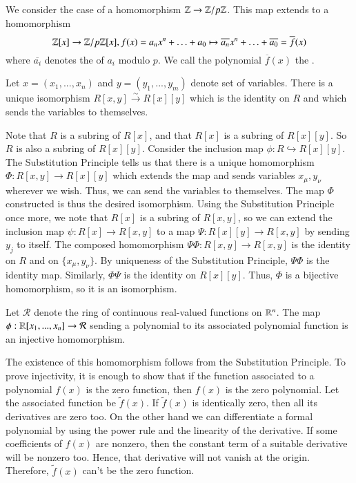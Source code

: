 \documentclass[12pt, a4paper, twoside, openright, titlepage]{book}
\begin{document}
\begin{eg}{}{}
        We consider the case of a homomorphism $\mathbb Z \rightarrow \mathbb Z/p\mathbb Z$. This map extends to a homomorphism \begin{equation}
                \mathbb Z[x] \rightarrow \mathbb Z/p\mathbb Z[x], f(x) = a_nx^n+\hdots + a_0 \mapsto \overline{a_n}x^n+\hdots + \overline{a_0} = \overline{f}(x)
        \end{equation}
        where $\overline{a_i}$ denotes the  of $a_i$ modulo $p$. We call the polynomial $\overline{f}(x)$ the .
\end{eg}


\begin{cor}{}{}
        Let $x = (x_1,...,x_n)$ and $y = (y_1,...,y_m)$ denote set of variables. There is a unique isomorphism $R[x,y] \xrightarrow{\sim}R[x][y]$ which is the identity on $R$ and which sends the variables to themselves.
\end{cor}
\begin{proof*}{}{}
        Note that $R$ is a subring of $R[x]$, and that $R[x]$ is a subring of $R[x][y]$. So $R$ is also a subring of $R[x][y]$. Consider the inclusion map $\phi:R\hookrightarrow R[x][y]$. The Substitution Principle tells us that there is a unique homomorphism $\Phi:R[x,y] \rightarrow R[x][y]$ which extends the map and sends variables $x_{\mu},y_{\nu}$ wherever we wish. Thus, we can send the variables to themselves. The map $\Phi$ constructed is thus the desired isomorphism. Using the Substitution Principle once more, we note that $R[x]$ is a subring of $R[x,y]$, so we can extend the inclusion map $\psi:R[x] \rightarrow R[x,y]$ to a map $\Psi:R[x][y] \rightarrow R[x,y]$ by sending $y_j$ to itself. The composed homomorphism $\Psi\Phi: R[x,y] \rightarrow R[x,y]$ is the identity on $R$ and on $\{x_{\mu},y_{\nu}\}$. By uniqueness of the Substitution Principle, $\Psi\Phi$ is the identity map. Similarly, $\Phi\Psi$ is the identity on $R[x][y]$. Thus, $\Phi$ is a bijective homomorphism, so it is an isomorphism.
\end{proof*}


\begin{prop}{}{}
        Let $\mathcal{R}$ denote the ring of continuous real-valued functions on $\mathbb R^n$. The map $\phi:\mathbb R[x_1,...,x_n]\rightarrow \mathcal{R}$ sending a polynomial to its associated polynomial function is an injective homomorphism.
\end{prop}
\begin{proof*}{}{}
        The existence of this homomorphism follows from the Substitution Principle. To prove injectivity, it is enough to show that if the function associated to a polynomial $f(x)$ is the zero function, then $f(x)$ is the zero polynomial. Let the associated function be $\widetilde{f}(x)$. If $\widetilde{f}(x)$ is identically zero, then all its derivatives are zero too. On the other hand we can differentiate a formal polynomial by using the power rule and the linearity of the derivative. If some coefficients of $f(x)$ are nonzero, then the constant term of a suitable derivative will be nonzero too. Hence, that derivative will not vanish at the origin. Therefore, $\widetilde{f}(x)$ can't be the zero function.
\end{proof*}
\end{document}
